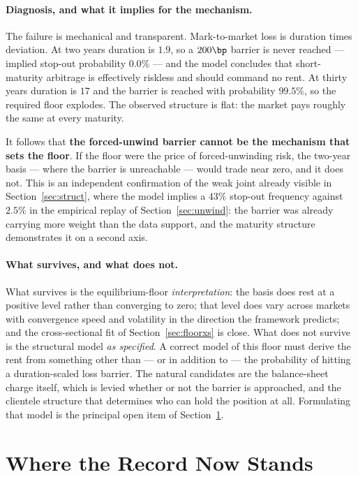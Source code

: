 \documentclass[11pt]{article}
\begin{document}
\paragraph{Diagnosis, and what it implies for the mechanism.} The failure is mechanical and
transparent. Mark-to-market loss is duration times deviation. At two years duration is $1.9$, so a
$200\bp$ barrier is never reached --- implied stop-out probability $0.0\%$ --- and the model
concludes that short-maturity arbitrage is effectively riskless and should command no rent. At
thirty years duration is $17$ and the barrier is reached with probability $99.5\%$, so the required
floor explodes. The observed structure is flat: the market pays roughly the same at every maturity.

It follows that \textbf{the forced-unwind barrier cannot be the mechanism that sets the floor}. If
the floor were the price of forced-unwinding risk, the two-year basis --- where the barrier is
unreachable --- would trade near zero, and it does not. This is an independent confirmation of the
weak joint already visible in Section~\ref{sec:struct}, where the model implies a $43\%$ stop-out
frequency against $2.5\%$ in the empirical replay of Section~\ref{sec:unwind}: the barrier was
already carrying more weight than the data support, and the maturity structure demonstrates it on a
second axis.

\paragraph{What survives, and what does not.} What survives is the equilibrium-floor
\emph{interpretation}: the basis does rest at a positive level rather than converging to zero; that
level does vary across markets with convergence speed and volatility in the direction the framework
predicts; and the cross-sectional fit of Section~\ref{sec:floorxs} is close. What does not survive
is the structural model \emph{as specified}. A correct model of this floor must derive the rent
from something other than --- or in addition to --- the probability of hitting a duration-scaled
loss barrier. The natural candidates are the balance-sheet charge itself, which is levied whether
or not the barrier is approached, and the clientele structure that determines who can hold the
position at all. Formulating that model is the principal open item of Section~\ref{sec:open2}.

\section{Where the Record Now Stands}\label{sec:open2}
\end{document}
